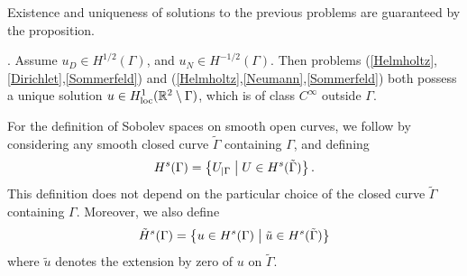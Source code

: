 \documentclass[a4paper]{article}
\begin{document}
\noindent Existence and uniqueness of solutions to the previous problems are guaranteed by the proposition.
\begin{proposition}
\cite{stephan1984augmented,wendland1990hypersingular,monch1996numerical}. Assume $u_D \in H^{1/2}(\Gamma)$, and $u_N \in H^{-1/2}(\Gamma)$. 
Then problems (\ref{Helmholtz},\ref{Dirichlet},\ref{Sommerfeld}) and (\ref{Helmholtz},\ref{Neumann},\ref{Sommerfeld}) both possess a unique solution 
$u \in H^1_\textup{loc}(\mathbb{R}^2 \setminus \Gamma)$, which is of class $C^{\infty}$ outside $\Gamma$. \end{proposition}
\noindent For the definition of Sobolev spaces on smooth open curves, we follow
\cite{mclean2000strongly} by considering any smooth closed curve $\tilde{\Gamma}$ containing $\Gamma$, and defining 
\[H^s(\Gamma) = \left\{U_{|\Gamma}\mathrel{}\middle|\mathrel{} U \in H^s(\tilde{\Gamma}) \right\}.\]
This definition does not depend on the particular choice of the closed curve $\tilde{\Gamma}$ containing $\Gamma$. Moreover, we also define
\[\tilde{H}^s(\Gamma) = \left\{u \in H^s(\Gamma)\mathrel{}\middle|\mathrel{}\tilde{u} \in H^s(\tilde{\Gamma})\right\}\]
where $\tilde{u}$ denotes the extension by zero of $u$ on $\tilde{\Gamma}$.
\end{document}
